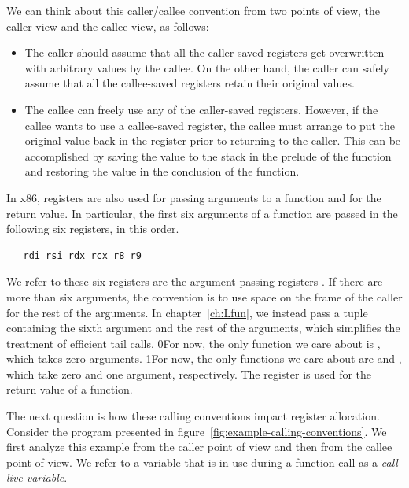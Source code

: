 \documentclass[7x10]{TimesAPriori_MIT}%
\def\racketEd{0}
\def\pythonEd{1}
\def\edition{1}
\newcommand{\racket}[1]{{\if\edition\racketEd{#1}\fi}}
\newcommand{\pythonColor}[0]{}
\newcommand{\python}[1]{{\if\edition\pythonEd\pythonColor #1\fi}}
\numberwithin{theorem}{chapter}
\numberwithin{definition}{chapter}
\numberwithin{equation}{chapter}
\begin{document}
We can think about this caller/callee convention from two points of
view, the caller view and the callee view, as follows:
\begin{itemize}
\item The caller should assume that all the caller-saved registers get
  overwritten with arbitrary values by the callee.  On the other hand,
  the caller can safely assume that all the callee-saved registers
  retain their original values.
\item The callee can freely use any of the caller-saved registers.
  However, if the callee wants to use a callee-saved register, the
  callee must arrange to put the original value back in the register
  prior to returning to the caller. This can be accomplished by saving
  the value to the stack in the prelude of the function and restoring
  the value in the conclusion of the function.
\end{itemize}

In x86, registers are also used for passing arguments to a function
and for the return value.  In particular, the first six arguments of a
function are passed in the following six registers, in this order.
\begin{lstlisting}
   rdi rsi rdx rcx r8 r9
\end{lstlisting}
We refer to these six registers are the argument-passing registers
.
If there are more than six arguments, the convention is to use space
on the frame of the caller for the rest of the arguments. In
chapter~\ref{ch:Lfun}, we instead pass a tuple containing the sixth
argument and the rest of the arguments, which simplifies the treatment
of efficient tail calls.
%
\racket{For now, the only function we care about is ,
  which takes zero arguments.}
%
\python{For now, the only functions we care about are \code{read\_int}
  and \code{print\_int}, which take zero and one argument, respectively.}
%
The register  is used for the return value of a function.

The next question is how these calling conventions impact register
allocation. Consider the \LangVar{} program presented in
figure~\ref{fig:example-calling-conventions}.  We first analyze this
example from the caller point of view and then from the callee point
of view. We refer to a variable that is in use during a function call
as a \emph{call-live variable}.
\end{document}
